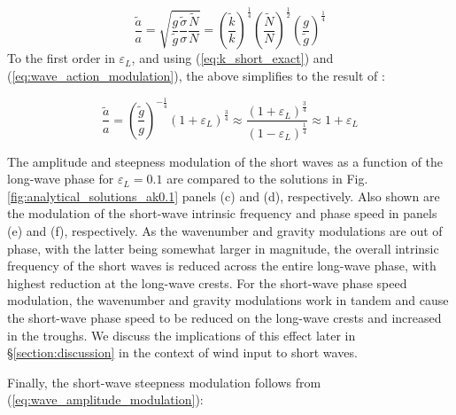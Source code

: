 \documentclass[lineno]{jfm}
\begin{document}
\begin{equation}
\label{eq:wave_amplitude_modulation}
\dfrac{\widetilde{a}}{a} = \sqrt{
  \dfrac{g}{\widetilde{g}}
  \dfrac{\widetilde{\sigma}}{\sigma}
  \dfrac{\widetilde{N}}{N}}
=
  \left( \dfrac{\widetilde{k}}{k} \right)^{\frac{1}{4}}
  \left( \dfrac{\widetilde{N}}{N} \right)^{\frac{1}{2}}
  \left( \dfrac{g}{\widetilde{g}} \right)^{\frac{1}{4}}
\end{equation}
To the first order in $\varepsilon_L$, and using (\ref{eq:k_short_exact})
and (\ref{eq:wave_action_modulation}), the above simplifies to the result of
\citet{longuet1960changes}:

\begin{equation}
\label{eq:wave_amplitude_modulation_order1}
\dfrac{\widetilde{a}}{a} = 
  \left( \dfrac{\widetilde{g}}{g} \right)^{-\frac{1}{4}}
  \left( 1 + \varepsilon_L \right)^{\frac{3}{4}}
  \approx \frac{(1 + \varepsilon_L)^{\frac{3}{4}}}{(1 - \varepsilon_L)^{\frac{1}{4}}}
  \approx 1 + \varepsilon_L
\end{equation}

The amplitude and steepness modulation of the short waves as a function of the
long-wave phase for $\varepsilon_L = 0.1$ are compared to the
\citet{longuet1960changes} solutions in Fig.
\ref{fig:analytical_solutions_ak0.1} panels (c) and (d), respectively.
Also shown are the modulation of the short-wave intrinsic frequency and phase
speed in panels (e) and (f), respectively.
As the wavenumber and gravity modulations are out of phase, with the latter
being somewhat larger in magnitude, the overall intrinsic frequency of the
short waves is reduced across the entire long-wave phase, with highest reduction
at the long-wave crests.
For the short-wave phase speed modulation, the wavenumber and gravity modulations
work in tandem and cause the short-wave phase speed to be reduced on the long-wave
crests and increased in the troughs.
We discuss the implications of this effect later in \S\ref{section:discussion}
in the context of wind input to short waves.

Finally, the short-wave steepness modulation follows from (\ref{eq:wave_amplitude_modulation}):
\end{document}
